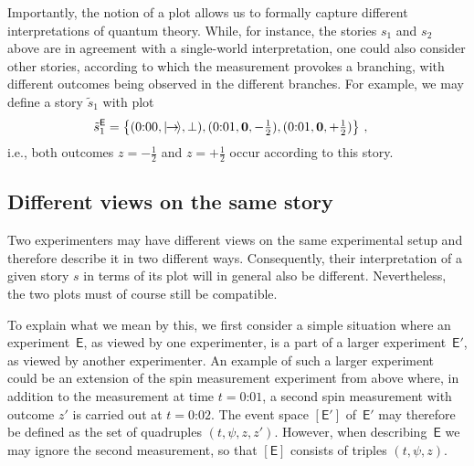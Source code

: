 \documentclass{article}
\theoremstyle{plain}
\theoremstyle{definition}
\newcommand*{\ket}[1]{{| #1 \rangle}}
\newcommand*{\Exp}{\mathsf{E}}
\newcommand*{\Expp}{\mathsf{E'}}
\newcommand*{\spinright}{\ket{{\hspace{-0.2ex}\rightarrow\hspace{-0.4ex}}}}
\newcommand*{\sminus}{{\textstyle - \frac{1}{2}}}
\newcommand*{\splus}{{\textstyle + \frac{1}{2}}}
\begin{document}
Importantly, the notion of a plot allows us to formally capture  different interpretations of quantum theory.  While, for instance, the stories $s_1$ and $s_2$ above are in agreement with a single-world interpretation, one could also consider other stories, according to which the measurement provokes a branching, with different outcomes being observed in the different branches. For example, we may define a story $\tilde{s}_1$ with plot
\begin{align*}
  \tilde{s}_1^{\Exp} & =  \bigl\{ (\text{0:00}, \spinright, \bot),  (\text{0:01}, \mathbf{0},  \sminus), (\text{0:01}, \mathbf{0},  \splus)  \bigr\} \ ,
\end{align*}
i.e., both outcomes $z = \sminus$ and $z = \splus$ occur according to this story. 


\subsection{Different views on the same story} \label{sec_views}

Two experimenters may have different views on the same experimental setup and therefore describe it in two different ways. Consequently, their interpretation of a given story $s$ in terms of its plot will in general also be different. Nevertheless, the two plots must of course still be compatible. 


To explain what we mean by this, we first  consider a simple situation where an experiment~$\Exp$, as viewed by one experimenter,  is a part of a larger experiment~$\Expp$, as viewed by another experimenter. An example of such a larger experiment could be an  extension of the spin measurement experiment from above where, in addition to the measurement at time $t = \text{0:01}$, a second spin measurement with outcome $z'$ is carried out at $t = \text{0:02}$.  The event space $[\Expp]$ of~$\Expp$ may therefore be defined as the set of  quadruples $(t, \psi, z, z')$. However, when describing~$\Exp$ we may ignore the second measurement, so that $[\Exp]$ consists of triples $(t, \psi, z)$. 
\end{document}
